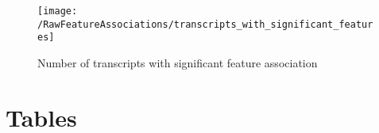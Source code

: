 \documentclass[graybox]{svmult}
\begin{document}
\begin{figure}[H]
\centering
\texttt{[image: /RawFeatureAssociations/transcripts\_with\_significant\_features]}
\caption{Number of transcripts with significant feature association}
\label{fig:transcripts_with_significant_features}
\end{figure}








\section{Tables}
\end{document}
